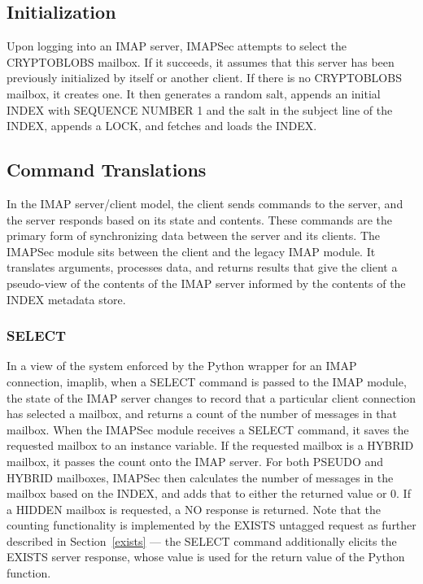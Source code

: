 \documentclass[pageno]{jpaper}
\newcommand{\project}{IMAPSec }
\begin{document}
\subsection{Initialization}
\label{initialization}

Upon logging into an IMAP server, \project attempts to select the CRYPTOBLOBS mailbox. If it succeeds, it assumes that this server has been previously initialized by itself or another client. If there is no CRYPTOBLOBS mailbox, it creates one. It then generates a random salt, appends an initial INDEX with SEQUENCE NUMBER 1 and the salt in the subject line of the INDEX, appends a LOCK, and fetches and loads the INDEX.

\subsection{Command Translations}
In the IMAP server/client model, the client sends commands to the server, and the server responds based on its state and contents. These commands are the primary form of synchronizing data between the server and its clients. The \project module sits between the client and the legacy IMAP module. It translates arguments, processes data, and returns results that give the client a pseudo-view of the contents of the IMAP server informed by the contents of the INDEX metadata store.

\subsubsection{SELECT}
\label{select}

In a view of the system enforced by the Python wrapper for an IMAP connection, imaplib, when a SELECT command is passed to the IMAP module, the state of the IMAP server changes to record that a particular client connection has selected a mailbox, and returns a count of the number of messages in that mailbox. When the \project module receives a SELECT command, it saves the requested mailbox to an instance variable. If the requested mailbox is a HYBRID mailbox, it passes the count onto the IMAP server. For both PSEUDO and HYBRID mailboxes, \project then calculates the number of messages in the mailbox based on the INDEX, and adds that to either the returned value or 0. If a HIDDEN mailbox is requested, a NO response is returned. Note that the counting functionality is implemented by the EXISTS untagged request as further described in Section~\ref{exists} \---- the SELECT command additionally elicits the EXISTS server response, whose value is used for the return value of the Python function.
\end{document}
